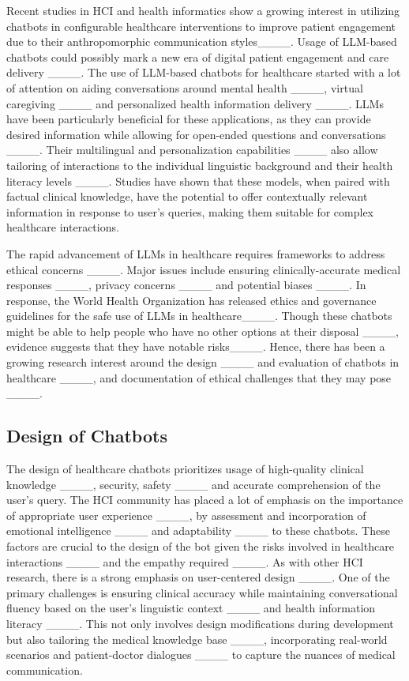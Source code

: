 Recent studies in HCI and health informatics show a growing interest in utilizing chatbots in configurable healthcare interventions to improve patient engagement due to their anthropomorphic communication styles____. Usage of LLM-based chatbots could possibly mark a new era of digital patient engagement and care delivery ____. The use of LLM-based chatbots for healthcare started with a lot of attention on aiding conversations around mental health ____, virtual caregiving ____ and personalized health information delivery ____. LLMs have been particularly beneficial for these applications, as they can provide desired information while allowing for open-ended questions and conversations ____. Their multilingual and personalization capabilities ____ also allow tailoring of interactions to the individual linguistic background and their health literacy levels ____. Studies have shown that these models, when paired with factual clinical knowledge, have the potential to offer contextually relevant information in response to user's queries, making them suitable for complex healthcare interactions. 

The rapid advancement of LLMs in healthcare requires frameworks to address ethical concerns ____.
Major issues include ensuring clinically-accurate medical responses ____, privacy concerns ____ and potential biases ____. In response, the World Health Organization has released ethics and governance guidelines for the safe use of LLMs in healthcare____. Though these chatbots might be able to help people who have no other options at their disposal ____, evidence suggests that they have notable risks____. Hence, there has been a growing research interest around the design ____ and evaluation of chatbots in healthcare ____, and documentation of ethical challenges that they may pose ____. 

\subsection{Design of Chatbots}
The design of healthcare chatbots prioritizes usage of high-quality clinical knowledge ____, security, safety ____ and accurate comprehension of the user's query. The HCI community has placed a lot of emphasis on the importance of appropriate user experience ____, by assessment and incorporation of emotional intelligence ____ and adaptability ____ to these chatbots. These factors are crucial to the design of the bot given the risks involved in healthcare interactions ____ and the empathy required ____. As with other HCI research, there is a strong emphasis on user-centered design ____. One of the primary challenges is ensuring clinical accuracy while maintaining conversational fluency based on the user’s linguistic context ____ and health information literacy ____. This not only involves design modifications during development but also tailoring the medical knowledge base ____, incorporating real-world scenarios and patient-doctor dialogues ____ to capture the nuances of medical communication. 

